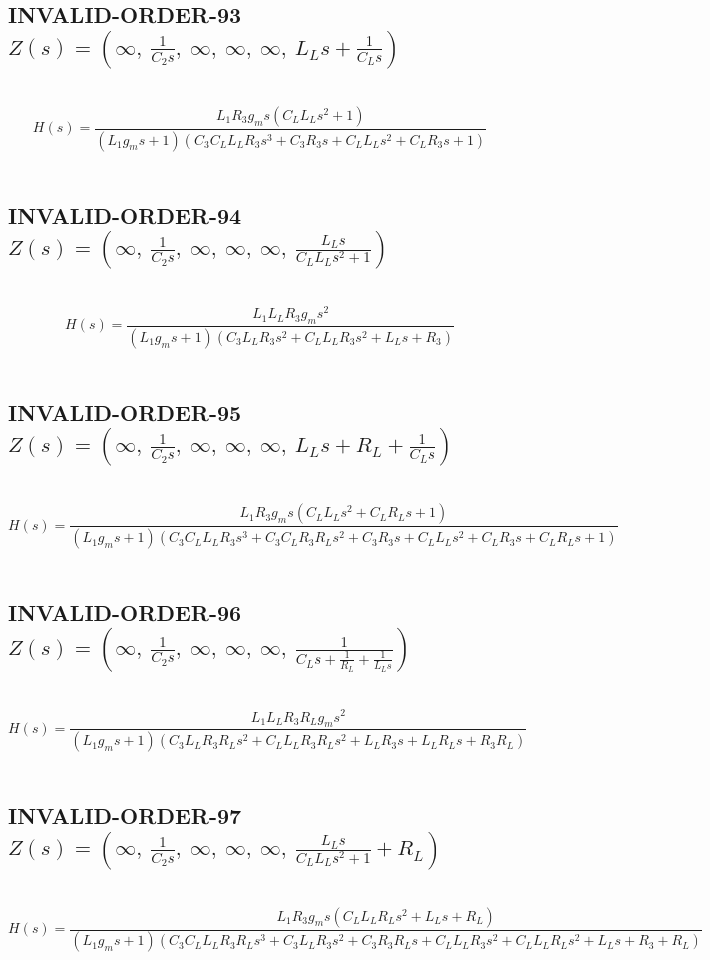 \documentclass{article}
\begin{document}
\subsection{INVALID-ORDER-93 $Z(s) = \left( \infty, \  \frac{1}{C_{2} s}, \  \infty, \  \infty, \  \infty, \  L_{L} s + \frac{1}{C_{L} s}\right)$ } \ 
\textbf{\[H(s) = \frac{L_{1} R_{3} g_{m} s \left(C_{L} L_{L} s^{2} + 1\right)}{\left(L_{1} g_{m} s + 1\right) \left(C_{3} C_{L} L_{L} R_{3} s^{3} + C_{3} R_{3} s + C_{L} L_{L} s^{2} + C_{L} R_{3} s + 1\right)}\] } \ 
\subsection{INVALID-ORDER-94 $Z(s) = \left( \infty, \  \frac{1}{C_{2} s}, \  \infty, \  \infty, \  \infty, \  \frac{L_{L} s}{C_{L} L_{L} s^{2} + 1}\right)$ } \ 
\textbf{\[H(s) = \frac{L_{1} L_{L} R_{3} g_{m} s^{2}}{\left(L_{1} g_{m} s + 1\right) \left(C_{3} L_{L} R_{3} s^{2} + C_{L} L_{L} R_{3} s^{2} + L_{L} s + R_{3}\right)}\] } \ 
\subsection{INVALID-ORDER-95 $Z(s) = \left( \infty, \  \frac{1}{C_{2} s}, \  \infty, \  \infty, \  \infty, \  L_{L} s + R_{L} + \frac{1}{C_{L} s}\right)$ } \ 
\textbf{\[H(s) = \frac{L_{1} R_{3} g_{m} s \left(C_{L} L_{L} s^{2} + C_{L} R_{L} s + 1\right)}{\left(L_{1} g_{m} s + 1\right) \left(C_{3} C_{L} L_{L} R_{3} s^{3} + C_{3} C_{L} R_{3} R_{L} s^{2} + C_{3} R_{3} s + C_{L} L_{L} s^{2} + C_{L} R_{3} s + C_{L} R_{L} s + 1\right)}\] } \ 
\subsection{INVALID-ORDER-96 $Z(s) = \left( \infty, \  \frac{1}{C_{2} s}, \  \infty, \  \infty, \  \infty, \  \frac{1}{C_{L} s + \frac{1}{R_{L}} + \frac{1}{L_{L} s}}\right)$ } \ 
\textbf{\[H(s) = \frac{L_{1} L_{L} R_{3} R_{L} g_{m} s^{2}}{\left(L_{1} g_{m} s + 1\right) \left(C_{3} L_{L} R_{3} R_{L} s^{2} + C_{L} L_{L} R_{3} R_{L} s^{2} + L_{L} R_{3} s + L_{L} R_{L} s + R_{3} R_{L}\right)}\] } \ 
\subsection{INVALID-ORDER-97 $Z(s) = \left( \infty, \  \frac{1}{C_{2} s}, \  \infty, \  \infty, \  \infty, \  \frac{L_{L} s}{C_{L} L_{L} s^{2} + 1} + R_{L}\right)$ } \ 
\textbf{\[H(s) = \frac{L_{1} R_{3} g_{m} s \left(C_{L} L_{L} R_{L} s^{2} + L_{L} s + R_{L}\right)}{\left(L_{1} g_{m} s + 1\right) \left(C_{3} C_{L} L_{L} R_{3} R_{L} s^{3} + C_{3} L_{L} R_{3} s^{2} + C_{3} R_{3} R_{L} s + C_{L} L_{L} R_{3} s^{2} + C_{L} L_{L} R_{L} s^{2} + L_{L} s + R_{3} + R_{L}\right)}\] } \ 
\end{document}
